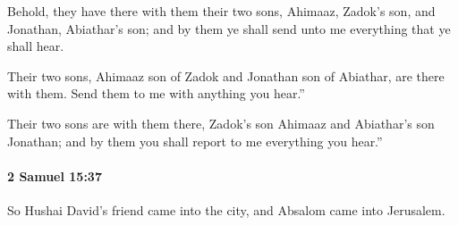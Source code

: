 			\begin{versebox}
					\item[BHS] 
					\item[ASV] Behold, they have there with them their two sons, Ahimaaz, Zadok's son, and Jonathan, Abiathar's son; and by them ye shall send unto me everything that ye shall hear.
					\item[NIV] Their two sons, Ahimaaz son of Zadok and Jonathan son of Abiathar, are there with them. Send them to me with anything you hear.”
					\item[NRSV] Their two sons are with them there, Zadok’s son Ahimaaz and Abiathar’s son Jonathan; and by them you shall report to me everything you hear.”
			\end{versebox}

		\paragraph{2 Samuel 15:37} %
			\label{2SAMUEL-15-37}

			So Hushai David’s friend came into the city, and Absalom came into Jerusalem.

